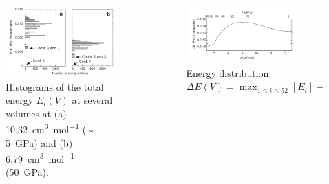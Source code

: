 \documentclass[13pt,aspectratio=169]{beamer}
\begin{document}
\begin{frame}{\subsecname}
	\begin{columns}
		\begin{column}{0.45\textwidth}
			\begin{figure}
				\includegraphics[width=\columnwidth]{images/deltae}%
				\caption{Histograms of the total energy $E_i(V)$ at several volumes at (a)
					\SI{10.32}{\cubic\centi\meter\per\mol} ($\sim$\SI{5}{\giga\pascal}) and (b) \SI{6.79}{\cubic\centi\meter\per\mol} (\SI{50}{\giga\pascal}).}
			\end{figure}
		\end{column}

		\begin{column}{0.45\textwidth}
			\begin{figure}
				\includegraphics[width=\columnwidth]{images/dltevsp}%
				\caption{Energy distribution: $\Delta E(V) = \max_{1 \leq i \leq 52}[E_i] - \min_{1 \leq i \leq 52}[E_i]$}
			\end{figure}
		\end{column}
	\end{columns}
\end{frame}
\end{document}
